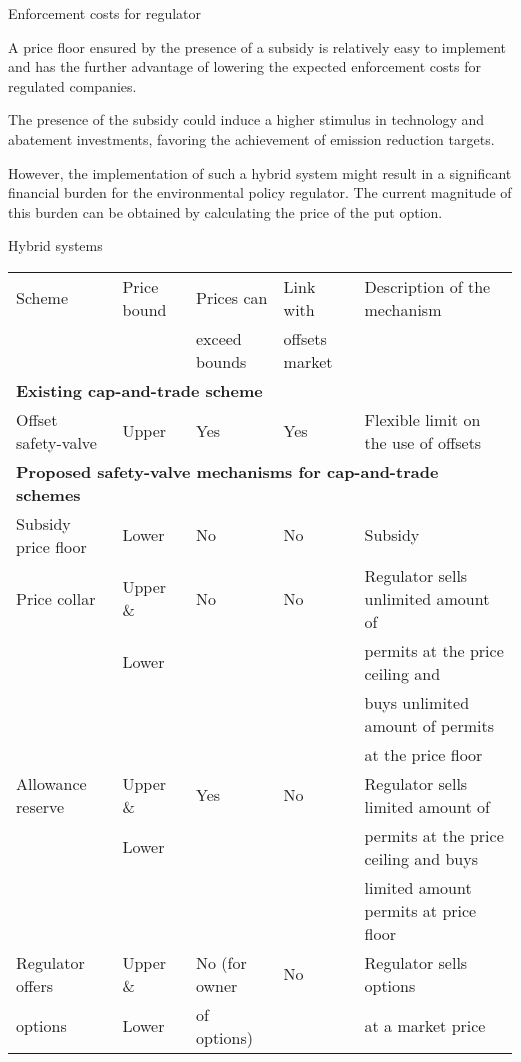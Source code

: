 {Enforcement costs for regulator}


	A price floor ensured by the presence of a subsidy is relatively easy to implement and has the further advantage of lowering the expected enforcement costs for regulated companies.

	The presence of the subsidy could induce a higher stimulus in technology and abatement investments, favoring the achievement of emission reduction targets.

	However, the implementation of such a hybrid system might result in a significant financial burden for the environmental policy regulator. The current magnitude of this burden can be obtained by calculating the price of the put option.


{Hybrid systems }
{\tiny
\begin{table}
\centering
\begin{tabular}{|l|l|l|l|l|}
\hline
Scheme & Price bound & Prices can & Link with & Description of the mechanism \\
 &  & exceed bounds & offsets market &  \\
\hline
\multicolumn{5}{|l|}{\textbf{Existing cap-and-trade scheme}} \\
\hline
Offset safety-valve & Upper & Yes & Yes & Flexible limit on the use of offsets \\
\hline
\multicolumn{5}{|l|}{\textbf{Proposed safety-valve mechanisms for cap-and-trade schemes}} \\
\hline
Subsidy price floor & Lower & No & No & Subsidy \\
\hline
Price collar & Upper \&  & No & No & Regulator sells unlimited amount of \\
& Lower & & &                                   permits at the price ceiling and\\
  &   &  &  &                               buys unlimited amount of permits    \\
 &   &  &  &                              at the price floor \\
\hline
Allowance reserve & Upper \&  & Yes & No & Regulator sells limited amount of  \\
 & Lower  & &  &                                     permits at the price ceiling and buys  \\
 &   & &  &                                     limited amount permits at price floor \\
\hline
Regulator offers  & Upper \&  & No (for owner & No & Regulator sells options  \\
options                        &       Lower         & of options)    &    &  at a market price\\
\hline
\end{tabular}
\end{table}
}

